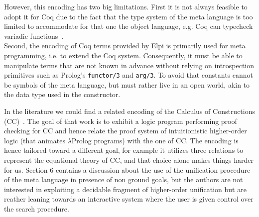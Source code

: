 \documentclass[sigconf,natbib=false,review]{acmart}
\begin{document}
\noindent
However, this encoding has two big limitations. First it is
not always feasible to adopt it for Coq due to the fact that the type system
of the meta language is too limited to accommodate for that one the object language,
e.g. Coq can typecheck variadic functions~\cite{cpdt}. \\
Second, the encoding of Coq terms provided by Elpi is primarily used for meta
programming, i.e. to extend the Coq system. Consequently, it must be able to
manipulate terms that are not known in advance
without relying on introspection primitives such as Prolog's
\texttt{functor/3} and \texttt{arg/3}. To avoid that constants 
cannot be symbols of the meta language, but must rather
live in
an open world, akin to the  data type used in the 
constructor.

In the literature we could find a related encoding of the Calculus of
Constructions (CC)~\cite{felty93lics}. The goal of that work is to exhibit
a logic program performing proof checking for CC and hence relate the
proof system of intuitionistic higher-order logic (that animates $\lambda$Prolog
programs) with the one of CC. The encoding is hence tailored
toward a different goal, for example it utilizes three relations to represent the
equational theory of CC, and that choice alone makes things harder for us.
Section 6 contains a discussion about the use of the
unification procedure of the meta language in presence of non ground goals, but
the authors are not interested in exploiting a decidable fragment of
higher-order unification but are reather leaning towards an interactive
system where the user is given
control over the search procedure.
\end{document}
